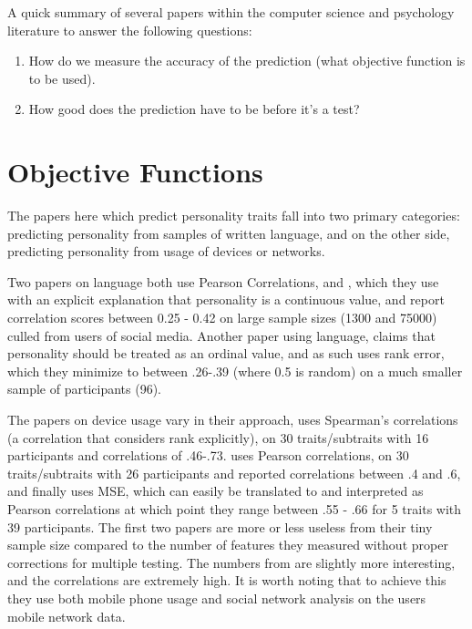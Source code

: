 \documentclass[a4paper,12pt]{article}
\begin{document}
A quick summary of several papers within the computer science and psychology literature to answer the following questions:

\begin{enumerate}

\item How do we measure the accuracy of the prediction (what objective function is to be used).

\item How good does the prediction have to be before it's a test?

\end{enumerate}

\section{Objective Functions}

The papers here which predict personality traits fall into two primary categories: predicting personality from samples of written language, and on the other side, predicting personality from usage of devices or networks.

Two papers on language both use Pearson Correlations, \cite{Arnoux2017} and \cite{Schwartz2013}, which they use with an explicit explanation that personality is a continuous value, and report correlation scores between 0.25 - 0.42 on large sample sizes (1300 and 75000) culled from users of social media. Another paper using language, \cite{Mairesse2006} claims that personality should be treated as an ordinal value, and as such uses rank error, which they minimize to between .26-.39 (where 0.5 is random) on a much smaller sample of participants (96).

The papers on device usage vary in their approach, \cite{Saati2005} uses Spearman's correlations (a correlation that considers rank explicitly), on 30 traits/subtraits with 16 participants and correlations of .46-.73. \cite{Khan2008} uses Pearson correlations, on 30 traits/subtraits with 26 participants and reported correlations between .4 and .6, and finally \cite{DeOliveira2011} uses MSE, which can easily be translated to and interpreted as Pearson correlations at which point they range between .55 - .66 for 5 traits with 39 participants. The first two papers are more or less useless from their tiny sample size compared to the number of features they measured without proper corrections for multiple testing. The numbers from \cite{DeOliveira2011} are slightly more interesting, and the correlations are extremely high. It is worth noting that to achieve this they use both mobile phone usage and social network analysis on the users mobile network data.
\end{document}
